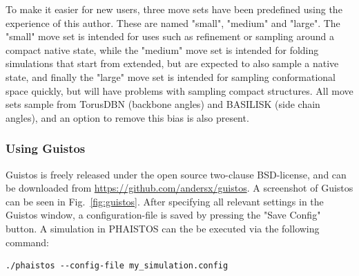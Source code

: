 To make it easier for new users, three move sets have been predefined using the experience of this author.
These are named "small", "medium" and "large".
The "small" move set is intended for uses such as refinement or sampling around a compact native state, 
while the "medium" move set is intended for folding simulations that start from extended, but are expected to also sample a native state, 
and finally the "large" move set is intended for sampling conformational space quickly, but will have problems with sampling compact structures.
All move sets sample from TorusDBN (backbone angles) and BASILISK (side chain angles), and an option to remove this bias is also present.

\subsubsection{Using Guistos}

Guistos is freely released under the open source two-clause BSD-license, and can be downloaded from \url{https://github.com/andersx/guistos}. A screenshot of Guistos can be seen in Fig.~\ref{fig:guistos}. 
After specifying all relevant settings in the Guistos window, a configuration-file is saved by pressing the "Save Config" button.
A simulation in PHAISTOS can the be executed via the following command:
\begin{lstlisting}
./phaistos --config-file my_simulation.config
\end{lstlisting}







